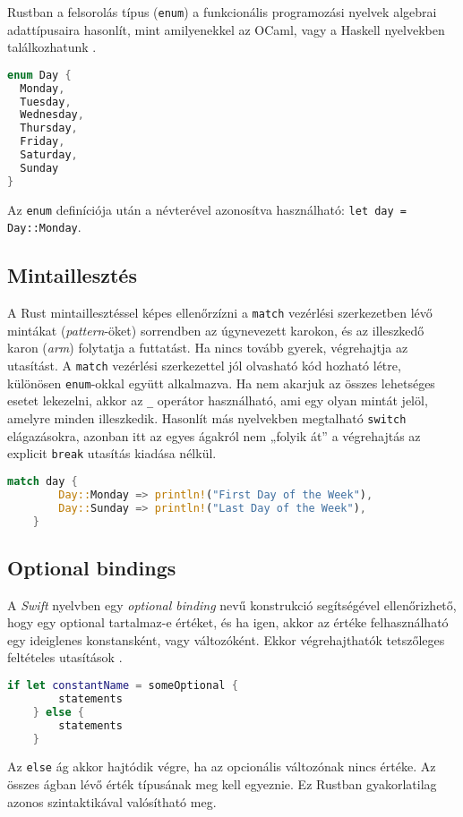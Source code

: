 Rustban a felsorolás típus (\lstinline{enum}) a funkcionális programozási nyelvek algebrai adattípusaira hasonlít, mint amilyenekkel az OCaml, vagy a Haskell nyelvekben találkozhatunk \cite{ocamlorg}.
\begin{lstlisting}[language=Rust, style=boxed]
enum Day {
  Monday,
  Tuesday,
  Wednesday,
  Thursday,
  Friday,
  Saturday,
  Sunday
}
\end{lstlisting}
Az \lstinline{enum} definíciója után a névterével azonosítva használható: \lstinline{let day = Day::Monday}.

\subsection{Mintaillesztés}
A Rust mintaillesztéssel képes ellenőrzízni a \lstinline{match} vezérlési szerkezetben lévő mintákat (\textit{pattern}-öket) sorrendben az úgynevezett karokon, és az illeszkedő karon (\textit{arm}) folytatja a futtatást. Ha nincs tovább gyerek, végrehajtja az utasítást. A \lstinline{match} vezérlési szerkezettel jól olvasható kód hozható létre, különösen \lstinline{enum}-okkal együtt alkalmazva. Ha nem akarjuk az összes lehetséges esetet lekezelni, akkor az \lstinline{_} operátor használható, ami egy olyan mintát jelöl, amelyre minden illeszkedik. Hasonlít más nyelvekben megtalható \lstinline{switch} elágazásokra, azonban itt az egyes ágakról nem „folyik át” a végrehajtás az explicit \lstinline{break} utasítás kiadása nélkül.
\begin{lstlisting}[language=Rust, style=boxed]
    match day {
        Day::Monday => println!("First Day of the Week"),
        Day::Sunday => println!("Last Day of the Week"),
    }
\end{lstlisting}

\subsection{Optional bindings}
A \textit{Swift} nyelvben egy \textit{optional binding} nevű konstrukció segítségével ellenőrizhető, hogy egy optional tartalmaz-e értéket, és ha igen, akkor az értéke felhasználható egy ideiglenes konstansként, vagy változóként. Ekkor végrehajthatók tetszőleges feltételes utasítások \cite{swift}.
\begin{lstlisting}[language=Swift]
    if let constantName = someOptional {
        statements
    } else {
        statements
    }
\end{lstlisting}
Az \texttt{else} ág akkor hajtódik végre, ha az opcionális változónak nincs értéke. Az összes ágban lévő érték típusának meg kell egyeznie. Ez Rustban gyakorlatilag azonos szintaktikával valósítható meg.

